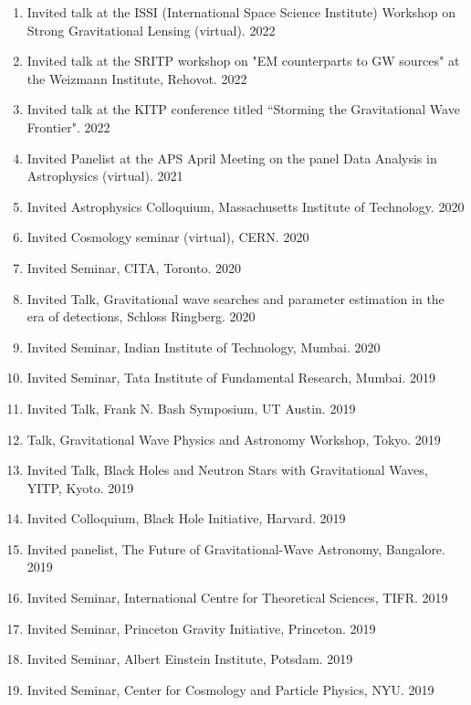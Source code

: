 \documentclass{article}
\newlength{\cvindent}
\newenvironment{cvlist}{%
  \begin{list}{}{%
    \setlength{\leftmargin}{\cvindent}%
    \setlength{\rightmargin}{0pt}%
    \setlength{\topsep}{0pt}%
    \setlength{\partopsep}{0pt}%
    \setlength{\parsep}{0pt}%
    \setlength{\itemsep}{0pt}%
  }%
  \item\relax
}{%
  \end{list}
}
\begin{document}
\begin{cvlist}
\begin{enumerate}
	       \item Invited talk at the ISSI (International Space Science Institute) Workshop on Strong Gravitational Lensing (virtual). \hfill 2022
	       \item Invited talk at the SRITP workshop on "EM counterparts to GW sources" at the Weizmann Institute, Rehovot. \hfill 2022
	       \item Invited talk at the KITP conference titled ``Storming the Gravitational Wave Frontier". \hfill 2022
	       \item Invited Panelist at the APS April Meeting on the panel Data Analysis in Astrophysics (virtual). \hfill 2021
	       \item Invited Astrophysics Colloquium, Massachusetts Institute of Technology. \hfill 2020
	       \item Invited Cosmology seminar (virtual), CERN. \hfill 2020
	       \item Invited Seminar, CITA, Toronto. \hfill 2020
	       \item Invited Talk, Gravitational wave searches and parameter estimation in the era of detections, Schloss Ringberg. \hfill 2020
	       \item Invited Seminar, Indian Institute of Technology, Mumbai. \hfill 2020
	       \item Invited Seminar, Tata Institute of Fundamental Research, Mumbai. \hfill 2019
	       \item Invited Talk, Frank N. Bash Symposium, UT Austin. \hfill 2019
	       \item Talk, Gravitational Wave Physics and Astronomy Workshop, Tokyo. \hfill 2019
	       \item Invited Talk, Black Holes and Neutron Stars with Gravitational Waves, YITP, Kyoto. \hfill 2019
	       \item Invited Colloquium, Black Hole Initiative, Harvard. \hfill 2019
	       \item Invited panelist, The Future of Gravitational-Wave Astronomy, Bangalore. \hfill 2019
	       \item Invited Seminar, International Centre for Theoretical Sciences, TIFR. \hfill 2019
               \item Invited Seminar, Princeton Gravity Initiative, Princeton. \hfill 2019
	       \item Invited Seminar, Albert Einstein Institute, Potsdam. \hfill 2019
	       \item Invited Seminar, Center for Cosmology and Particle Physics, NYU. \hfill 2019

\end{enumerate}
\end{cvlist}
\end{document}
